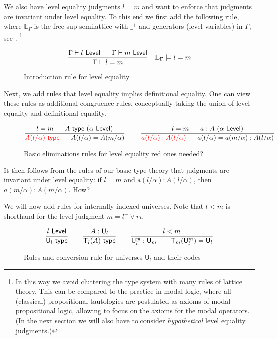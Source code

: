 \documentclass[11pt,a4paper]{article}
\theoremstyle{definition}
\newcommand{\UU}{\mathsf{U}}
\newcommand{\Level}{\mathsf{Level}}
\newcommand{\Lev}{{\mathbb{L}}}
\newcommand{\type}{\mathsf{type}}
\newcommand{\T}{\mathsf{T}}
\begin{document}
We also have level equality judgments $l = m$ and want to enforce
that judgments are invariant under level equality. To this end
we first add the following rule, where
$\Lev_\Gamma$ is the free sup-semilattice with $\_^+$
and generators (level variables) in $\Gamma$, see \cite{bezem-coquand:lattices}.%
\footnote{
In this way we avoid cluttering the type system with many
rules of lattice theory. This can be compared to the practice
in modal logic, where all (classical) propositional tautologies
are postulated as axioms of modal propositional logic, allowing to focus
on the axioms for the modal operators. (In the next section we will
also have to consider \emph{hypothetical} level equality judgments.)
}
\begin{figure}[H]
  \caption{Introduction rule for level equality}\label{fig:leveleq}
$$
\frac{\Gamma\vdash l~\Level~~~~~\Gamma\vdash m~\Level}
     {\Gamma\vdash l=m} {~~~\Lev_\Gamma \models l=m}
\belowdisplayshortskip 1pt
$$
\end{figure}

Next, we add rules that level equality implies definitional equality.
One can view these rules as additional congruence rules, conceptually
taking the union of level equality and definitional equality.

\begin{figure}[H]
  \caption{Basic eliminations rules for level equality {\color{red}red ones needed?}}%
  \label{fig:levelcongruence}
$$
\frac{l=m ~~~~~ A~\type~(\alpha~\Level)}
{{\color{red}A(l/\alpha)~\type}~~~~~A(l/\alpha) = A(m/\alpha)}
~~~~~~~
\frac{l=m ~~~~~ a:A~(\alpha~\Level)}
{{\color{red}a(l/\alpha): A(l/\alpha)}~~~~~
a(l/\alpha) = a(m/\alpha): A(l/\alpha)}
\belowdisplayshortskip 0pt
$$
\end{figure}

It then follows from the rules of our basic type theory that
judgments are invariant under level equality: if $l=m$ and
${a(l/\alpha) : A(l/\alpha)}$, then ${a(m/\alpha) : A(m/\alpha)}$.
{\color{red} How?}

We will now add rules for internally indexed universes.
Note that $l<m$ is shorthand for the level judgment $m= l^+ \vee m$.
\begin{figure}[H]
  \caption{Rules and conversion rule for universes $\UU_l$ and their codes}\label{fig:typeUl}
$$
\frac{l~\Level}{\UU_l~\type}~~~~~~
\frac{A:\UU_{l}}{\T_{l}(A)~\type}~~~~~~
\frac{l<m}{\UU^{m}_{l}:\UU_{m}~~~~~~\T_{m}({\UU^{m}_{l}}) = \UU_{l}}
\belowdisplayshortskip 0pt
$$
\end{figure}
\end{document}
